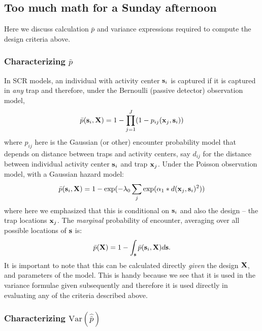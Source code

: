 \subsection{Too much math for a Sunday afternoon}

Here we discuss calculation $\bar{p}$ and variance expressions
required to compute the design criteria above. 

\subsubsection{Characterizing $\bar{p}$}

In SCR models, an individual with activity center ${\bf
  s}_{i}$ is captured if it is captured in {\it any} trap and
therefore, under the Bernoulli (passive detector) observation model,
\[
 \bar{p}({\bf s}_{i}, {\bf X}) = 1 - \prod_{j=1}^{J} (1- p_{ij}({\bf
   x}_{j}, {\bf s}_{i}))
\]
where $p_{ij}$ here is the Gaussian (or other) encounter probability
model that depends on distance between traps and activity centers,
say $d_{ij}$ for the distance between 
individual activity center ${\bf s}_{i}$ and trap ${\bf x}_{j}$.
Under the Poisson observation model, with a Gaussian hazard model:
\[
 \bar{p}({\bf s}_{i},{\bf X}) = 1 -  \exp(-\lambda_{0} \sum_{j}
 \exp(\alpha_{1}* d({\bf x}_{j}, {\bf s}_{i})^2 ))
\]
where here we emphasized that this is conditional on ${\bf s}_{i}$ and
also the design -- the trap locations ${\bf x}_{j}$.  The {\it
  marginal} probability of encounter, averaging over all possible
locations of ${\bf s}$ is:
\begin{equation}
 \bar{p}({\bf X}) = 1 - \int_{\bf s}    \bar{p}({\bf s}_{i},{\bf X})    d{\bf s}.
\label{design.eq.pbar}
\end{equation}
It is important to note that this can be calculated directly {\it
  given} the design ${\bf X}$, and parameters of the model. This is
handy because we see that it is used in the variance formulae given
subsequently and therefore it is used directly in evaluating any of
the criteria described above.


\subsubsection{Characterizing $\mbox{Var}(\hat{\bar{p}})$}

